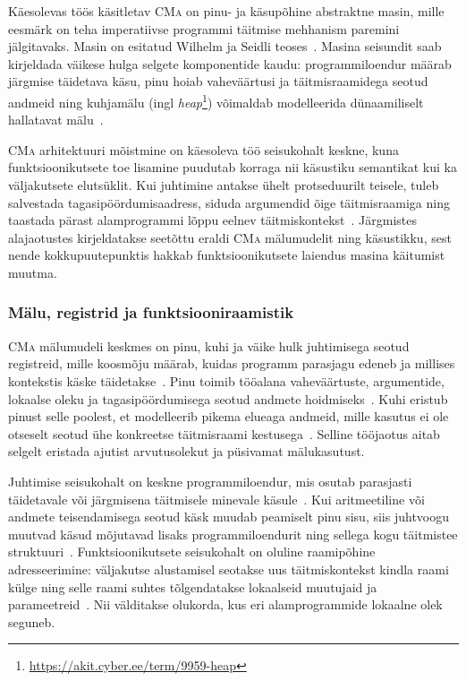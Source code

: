 Käesolevas töös käsitletav \textsc{CMa} on pinu- ja käsupõhine abstraktne masin, mille eesmärk on teha imperatiivse programmi täitmise mehhanism paremini jälgitavaks. Masin on esitatud Wilhelm ja Seidli teoses~\cite{wilhelm_imperative_2010}. Masina seisundit saab kirjeldada väikese hulga selgete komponentide kaudu: programmiloendur määrab järgmise täidetava käsu, pinu hoiab vaheväärtusi ja täitmisraamidega seotud andmeid ning kuhjamälu (ingl \emph{heap}\footnote{\url{https://akit.cyber.ee/term/9959-heap}}) võimaldab modelleerida dünaamiliselt hallatavat mälu~\cite{wilhelm_imperative_2010}.

\textsc{CMa} arhitektuuri mõistmine on käesoleva töö seisukohalt keskne, kuna funktsioonikutsete toe lisamine puudutab korraga nii käsustiku semantikat kui ka väljakutsete elutsüklit. Kui juhtimine antakse ühelt protseduurilt teisele, tuleb salvestada tagasipöördumisaadress, siduda argumendid õige täitmisraamiga ning taastada pärast alamprogrammi lõppu eelnev täitmiskontekst~\cite{mogensen_programming_2026}. Järgmistes alajaotustes kirjeldatakse seetõttu eraldi \textsc{CMa} mälumudelit ning käsustikku, sest nende kokkupuutepunktis hakkab funktsioonikutsete laiendus masina käitumist muutma.

\subsubsection{Mälu, registrid ja funktsiooniraamistik}\label{taust:CMa:malu}

\textsc{CMa} mälumudeli keskmes on pinu, kuhi ja väike hulk juhtimisega seotud registreid, mille koosmõju määrab, kuidas programm parasjagu edeneb ja millises kontekstis käske täidetakse~\cite{wilhelm_imperative_2010}. Pinu toimib tööalana vaheväärtuste, argumentide, lokaalse oleku ja tagasipöördumisega seotud andmete hoidmiseks~\cite{mogensen_programming_2026}. Kuhi eristub pinust selle poolest, et modelleerib pikema elueaga andmeid, mille kasutus ei ole otseselt seotud ühe konkreetse täitmisraami kestusega~\cite{gabbrielli_programming_2023}. Selline tööjaotus aitab selgelt eristada ajutist arvutusolekut ja püsivamat mälukasutust.

Juhtimise seisukohalt on keskne programmiloendur, mis osutab parasjasti täidetavale või järgmisena täitmisele minevale käsule~\cite{wilhelm_imperative_2010}. Kui aritmeetiline või andmete teisendamisega seotud käsk muudab peamiselt pinu sisu, siis juhtvoogu muutvad käsud mõjutavad lisaks programmiloendurit ning sellega kogu täitmistee struktuuri~\cite{seidl_compiler_2012}. Funktsioonikutsete seisukohalt on oluline raamipõhine adresseerimine: väljakutse alustamisel seotakse uus täitmiskontekst kindla raami külge ning selle raami suhtes tõlgendatakse lokaalseid muutujaid ja parameetreid~\cite{mogensen_programming_2026}. Nii välditakse olukorda, kus eri alamprogrammide lokaalne olek seguneb.


